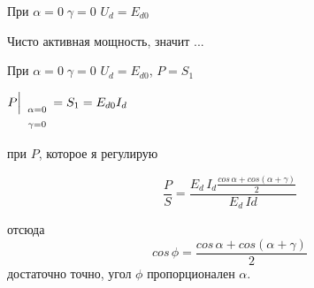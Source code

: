 
При $\alpha=0\;\gamma=0$ $U_d=E_{d0}$

Чисто активная мощность, значит ...

При $\alpha=0\;\gamma=0$ $U_d=E_{d0}$, $P=S_1$

$P\Bigl|_{\scriptstyle \begin{array}{c}\scriptstyle{\alpha=0}\\
    \scriptstyle{\gamma=0}\end{array}} = S_1 = E_{d0}I_d$

при $P$, которое я регулирую

$$
\frac{P}{S} = \frac{E_d\,I_d \frac{cos\,\alpha + cos(\alpha+\gamma)}{2}}{E_d\,Id}
$$

отсюда
$$
cos\,\phi = \frac{cos\,\alpha + cos(\alpha + \gamma)}{2}
$$
достаточно точно, угол $\phi$ пропорционален $\alpha$.
